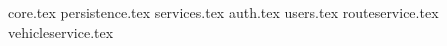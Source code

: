 {core.tex}
{persistence.tex}
{services.tex}
{auth.tex}
{users.tex}
{routeservice.tex}
{vehicleservice.tex}
